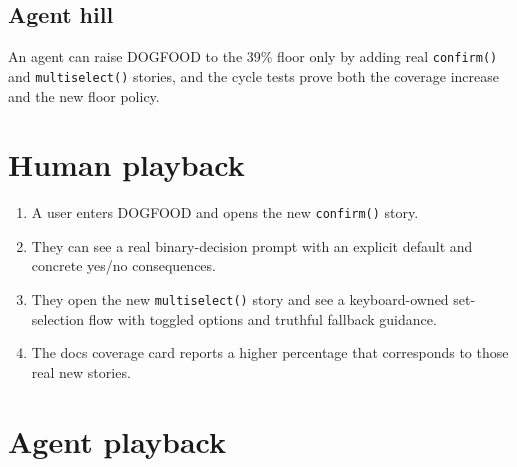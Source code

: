 \subsection{Agent hill}\label{record-071-agent-hill}

An agent can raise DOGFOOD to the 39\% floor only by adding real \texttt{c\allowbreak{}o\allowbreak{}n\allowbreak{}f\allowbreak{}i\allowbreak{}r\allowbreak{}m\allowbreak{}(\allowbreak{})} and \texttt{m\allowbreak{}u\allowbreak{}l\allowbreak{}t\allowbreak{}i\allowbreak{}s\allowbreak{}e\allowbreak{}l\allowbreak{}e\allowbreak{}c\allowbreak{}t\allowbreak{}(\allowbreak{})} stories, and the cycle tests prove both the coverage increase and the new floor policy.

\section{Human playback}\label{record-071-human-playback}

\begin{enumerate}
\def\labelenumi{\arabic{enumi}.}
\tightlist
\item
  A user enters DOGFOOD and opens the new \texttt{c\allowbreak{}o\allowbreak{}n\allowbreak{}f\allowbreak{}i\allowbreak{}r\allowbreak{}m\allowbreak{}(\allowbreak{})} story.
\item
  They can see a real binary-decision prompt with an explicit default and concrete yes/no consequences.
\item
  They open the new \texttt{m\allowbreak{}u\allowbreak{}l\allowbreak{}t\allowbreak{}i\allowbreak{}s\allowbreak{}e\allowbreak{}l\allowbreak{}e\allowbreak{}c\allowbreak{}t\allowbreak{}(\allowbreak{})} story and see a keyboard-owned set-selection flow with toggled options and truthful fallback guidance.
\item
  The docs coverage card reports a higher percentage that corresponds to those real new stories.
\end{enumerate}

\section{Agent playback}\label{record-071-agent-playback}

